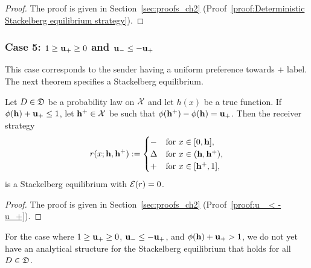 \begin{proof} The proof is given in Section~\ref{sec:proofs_ch2} (Proof~\ref{proof:Deterministic Stackelberg equilibrium strategy}).
\end{proof}



\subsubsection{Case 5: $1 \geq \mathbf{u_+} \geq 0$ and $\mathbf{u_-} \leq -\mathbf{u_+}$}

This case corresponds to the sender having a uniform preference towards $\plus$ label. The next theorem specifies a Stackelberg equilibrium.

\begin{thm}\label{thm:u_ < - u_+}
	Let $D \in \mathfrak{D}$ be a probability law on $\mathcal{X}$ and let $h(x)$ be a true function. If $\phi(\mathbf{h}) + \mathbf{u_+} \le 1$, let $\mathbf{h^{+}} \in \mathcal{X}$ be such that $\phi(\mathbf{h^{+}}) - \phi(\mathbf{h}) = \mathbf{u_+}$. Then the receiver strategy
	\[ r(x;\mathbf{h},\mathbf{h^{+}}):=
	\begin{cases}
		\mathbf{-} & \text{for } x \in [0,\mathbf{h}],\\
		\Delta & \text{for } x \in (\mathbf{h},\mathbf{h^{+}}),\\
		\mathbf{+} & \text{for } x \in [\mathbf{h^{+}},1],
	\end{cases}\]
	is a Stackelberg equilibrium with $\mathcal{E}(r) = 0$.
\end{thm}

\begin{proof} The proof is given in Section~\ref{sec:proofs_ch2} (Proof~\ref{proof:u_ < - u_+}).
\end{proof}

\begin{rem}
For the case where $1 \ge \mathbf{u_+} \ge 0$, $\mathbf{u_-} \le -\mathbf{u_+}$, and $\phi(\mathbf{h}) + \mathbf{u_+} > 1$, we do not yet have an analytical structure for the Stackelberg equilibrium that holds for all $D \in \mathfrak{D}$.
\end{rem}
